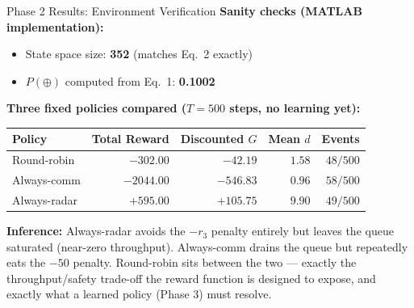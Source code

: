 \documentclass[aspectratio=169]{beamer}
\begin{document}
\begin{frame}{Phase 2 Results: Environment Verification}
  \footnotesize
  \textbf{Sanity checks (MATLAB implementation):}
  \begin{itemize}
    \setlength{\itemsep}{0.04cm}
    \item State space size: \textbf{352} (matches Eq.~2 exactly)
    \item $P(\oplus)$ computed from Eq.~1: \textbf{0.1002}
  \end{itemize}

  \vspace{0.25cm}
  \textbf{Three fixed policies compared ($T=500$ steps, no learning yet):}
  \begin{center}
  \begin{tabular}{lrrrr}
    \toprule
    \textbf{Policy} & \textbf{Total Reward} & \textbf{Discounted $G$} & \textbf{Mean $d$} & \textbf{Events} \\
    \midrule
    Round-robin   & $-302.00$  & $-42.19$  & $1.58$ & $48/500$ \\
    Always-comm   & $-2044.00$ & $-546.83$ & $0.96$ & $58/500$ \\
    Always-radar  & $+595.00$  & $+105.75$ & $9.90$ & $49/500$ \\
    \bottomrule
  \end{tabular}
  \end{center}

  \vspace{0.2cm}
  \textbf{Inference:} Always-radar avoids the $-r_3$ penalty entirely but leaves the queue saturated (near-zero throughput). Always-comm drains the queue but repeatedly eats the $-50$ penalty. Round-robin sits between the two --- exactly the throughput/safety trade-off the reward function is designed to expose, and exactly what a learned policy (Phase 3) must resolve.
\end{frame}
\end{document}
